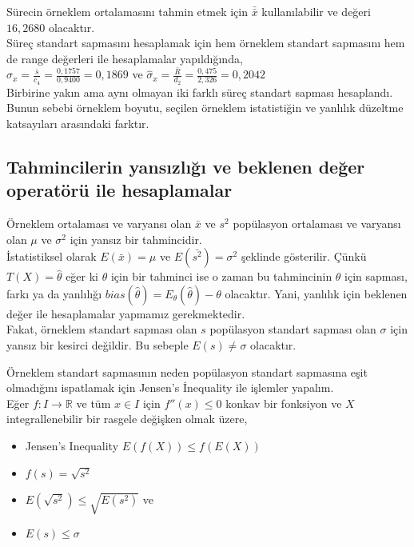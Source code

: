 Sürecin örneklem ortalamasını tahmin etmek için $\bar{\bar{x}}$ kullanılabilir ve değeri $16,2680$ olacaktır.\\

Süreç standart sapmasını hesaplamak için hem örneklem standart sapmasını hem de range değerleri ile hesaplamalar yapıldığında,\\


${\hat{\sigma}}_x = \frac{\bar{s}}{c_4} = \frac{0,1757}{0,9400} = 0,1869$
ve
${\hat{\sigma}}_x = \frac{\bar{R}}{d_2} = \frac{0,475}{2,326} = 0,2042$\\

Birbirine yakın ama aynı olmayan iki farklı süreç standart sapması hesaplandı. Bunun sebebi örneklem boyutu, seçilen örneklem istatistiğin ve yanlılık düzeltme katsayıları arasındaki farktır.

\subsection{Tahmincilerin yansızlığı ve beklenen değer operatörü ile hesaplamalar}

Örneklem ortalaması ve varyansı olan $\bar{x}$ ve $s^{2}$ popülasyon ortalaması ve varyansı olan $\mu$ ve $\sigma^{2}$ için yansız bir tahmincidir.\\

İstatistiksel olarak $E(\bar{x}) = \mu$ ve $E(\bar{s^{2}}) = \sigma^{2}$ şeklinde gösterilir. Çünkü $T(X) = \hat{\theta}$ eğer ki $\theta$ için bir tahminci ise o zaman bu tahmincinin $\theta$ için sapması, farkı ya da yanlılığı $bias(\hat{\theta}) = E_{\theta}(\hat{\theta}) - \theta$ olacaktır. Yani, yanlılık için beklenen değer ile hesaplamalar yapmamız gerekmektedir.\\

Fakat, örneklem standart sapması olan $s$ popülasyon standart sapması olan $\sigma$ için yansız bir kesirci değildir. Bu sebeple $E(s) \neq \sigma$ olacaktır.

Örneklem standart sapmasının neden popülasyon standart sapmasına eşit olmadığını ispatlamak için Jensen’s İnequality ile işlemler yapalım.\\

Eğer $f : I \to \mathbb{R}$ ve tüm $x \in I$ için $f''(x) \le 0$ konkav bir fonksiyon ve $X$ integrallenebilir bir rasgele değişken olmak üzere, 
\begin{itemize}[label*={}]
	\item 
	Jensen's Inequality $E(f(X)) \le f(E(X)) $
	\item 
	$f(s) = \sqrt{s^{2}}$
	\item
	$E(\sqrt{s^{2}}) \le \sqrt{E(s^{2})}$ ve 
	\item 
	$E(s) \le \sigma$
\end{itemize}

